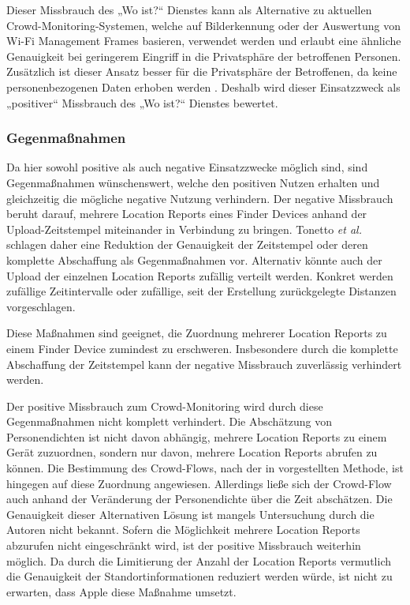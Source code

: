Dieser Missbrauch des „Wo ist?“ Dienstes kann als Alternative zu aktuellen Crowd-Monitoring-Systemen, welche auf Bilderkennung oder der Auswertung von Wi-Fi Management Frames basieren, verwendet werden und erlaubt eine ähnliche Genauigkeit bei geringerem Eingriff in die Privatsphäre der betroffenen Personen.
Zusätzlich ist dieser Ansatz besser für die Privatsphäre der Betroffenen, da keine personenbezogenen Daten erhoben werden \cite{Tonetto_FindMy}.
Deshalb wird dieser Einsatzzweck als „positiver“ Missbrauch des „Wo ist?“ Dienstes bewertet.


\subsubsection{Gegenmaßnahmen}
Da hier sowohl positive als auch negative Einsatzzwecke möglich sind, sind Gegenmaßnahmen wünschenswert, welche den positiven Nutzen erhalten und gleichzeitig die mögliche negative Nutzung verhindern.
Der negative Missbrauch beruht darauf, mehrere Location Reports eines Finder Devices anhand der Upload-Zeitstempel miteinander in Verbindung zu bringen.
Tonetto \textit{et al.} \cite{Tonetto_FindMy} schlagen daher eine Reduktion der Genauigkeit der Zeitstempel oder deren komplette Abschaffung als Gegenmaßnahmen vor.
Alternativ könnte auch der Upload der einzelnen Location Reports zufällig verteilt werden.
Konkret werden zufällige Zeitintervalle oder zufällige, seit der Erstellung zurückgelegte Distanzen vorgeschlagen.

Diese Maßnahmen sind geeignet, die Zuordnung mehrerer Location Reports zu einem Finder Device zumindest zu erschweren.
Insbesondere durch die komplette Abschaffung der Zeitstempel kann der negative Missbrauch zuverlässig verhindert werden.

Der positive Missbrauch zum Crowd-Monitoring wird durch diese Gegenmaßnahmen nicht komplett verhindert.
Die Abschätzung von Personendichten ist nicht davon abhängig, mehrere Location Reports zu einem Gerät zuzuordnen, sondern nur davon, mehrere Location Reports abrufen zu können.
Die Bestimmung des Crowd-Flows, nach der in \cite{Tonetto_FindMy} vorgestellten Methode, ist hingegen auf diese Zuordnung angewiesen.
Allerdings ließe sich der Crowd-Flow auch anhand der Veränderung der Personendichte über die Zeit abschätzen.
Die Genauigkeit dieser Alternativen Lösung ist mangels Untersuchung durch die Autoren nicht bekannt.
Sofern die Möglichkeit mehrere Location Reports abzurufen nicht eingeschränkt wird, ist der positive Missbrauch weiterhin möglich.
Da durch die Limitierung der Anzahl der Location Reports vermutlich die Genauigkeit der Standortinformationen reduziert werden würde, ist nicht zu erwarten, dass Apple diese Maßnahme umsetzt.

